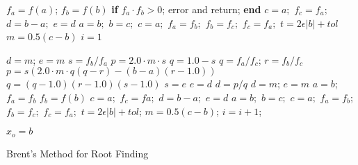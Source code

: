 \begin{center}
\begin{minipage}{6 in}
\begin{small}
\begin{algorithm}[H]

    $f_a = f(a)$; $f_b = f(b)$\;
    \textbf{if} $f_a \cdot f_b > 0$; error and return; \textbf{end} \;
    $c = a;$ $f_c = f_a;$ $d = b - a;$ $e = d$\;
    {
     $a = b;$ $b = c;$ $c = a;$
    $f_a = f_b;$ $f_b = f_c;$ $f_c = f_a;$
    }
    $t = 2\epsilon | b | + tol$\;
    $m = 0.5(c - b)$ \;
    $i = 1$\;
        {
          {
           $d = m$; $ e = m$\;
          }{
           $s = f_b/f_a$\;  %
              {
              $p = 2.0 \cdot m \cdot s$\;
              $q = 1.0 - s$\;
               }
              {
                $q = f_a/f_c$; $r = f_b/f_c$\;
                $p = s(2.0 \cdot m \cdot q (q-r) - (b - a)(r - 1.0))$\;
                $q = (q - 1.0)(r - 1.0)(s - 1.0)$\;
                }
        $s = e$\;  %
        $e = d$\;
           {
            $d = p/q$\;
         }{
            $d = m$; $e = m$\;
         }
       }
       $a  = b$; $f_a = f_b$\;
        {
        }
       $ f_b = f(b)$\;
         {
            $c = a;$ $f_c = fa;$ $d = b - a;$ $e = d$\;
            }
         {
            {
             $a = b;$ $b = c;$ $c = a;$
            $f_a = f_b;$ $f_b = f_c;$ $f_c = f_a;$
            }
                 }
        $t = 2\epsilon |b| + tol$; %
        $m    = 0.5(c - b)$;
        $ i = i + 1$;

    }
    $x_o = b$\;
    \hspace{.2 in}
    \label{alg:BrentsMethod}\caption{Brent's Method for Root Finding}
\end{algorithm}
\end{small}
\end{minipage}
\end{center}
